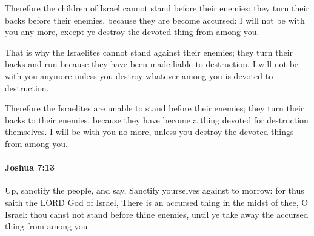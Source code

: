 			\begin{versebox}
					\item[BHS] 
					\item[ASV] Therefore the children of Israel cannot stand before their enemies; they turn their backs before their enemies, because they are become accursed: I will not be with you any more, except ye destroy the devoted thing from among you.
					\item[NIV] That is why the Israelites cannot stand against their enemies; they turn their backs and run because they have been made liable to destruction. I will not be with you anymore unless you destroy whatever among you is devoted to destruction.
					\item[NRSV] Therefore the Israelites are unable to stand before their enemies; they turn their backs to their enemies, because they have become a thing devoted for destruction themselves. I will be with you no more, unless you destroy the devoted things from among you.
			\end{versebox}

		\paragraph{Joshua 7:13} %
			\label{JOSHUA-7-13}

			Up, sanctify the people, and say, Sanctify yourselves against to morrow: for thus saith the LORD God of Israel, There is an accursed thing in the midst of thee, O Israel: thou canst not stand before thine enemies, until ye take away the accursed thing from among you.

